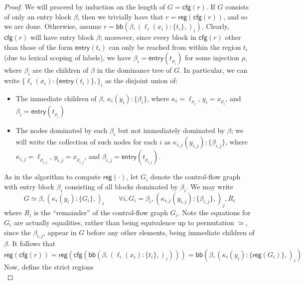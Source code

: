 \documentclass[acmsmall,screen,review]{acmart}
\newcommand{\ms}[1]{\ensuremath{\mathsf{#1}}}
\newcommand{\lto}{:}
\newcommand{\wbranch}[3]{#1(#2) \lto \{#3\}}
\newcommand{\toentry}[1]{\ms{entry}(#1)}
\newcommand{\tocfg}[1]{\ms{cfg}(#1)}
\newcommand{\adddom}[2]{\ms{bb}(#1, #2)}
\newcommand{\toreg}[1]{\ms{reg}(#1)}
\begin{document}
\begin{proof}
  We will proceed by induction on the length of $G = \tocfg{r}$. If $G$ consists of only an entry
  block $\beta$, then we trivially have that $r = \toreg{\tocfg{r}}$, and so we are done. Otherwise,
  assume $r = \adddom{\beta}{(\wbranch{\ell_i}{x_i}{t_i},)_i}$. Clearly, $\tocfg{r}$ will have entry
  block $\beta$; moreover, since every block in $\tocfg{r}$ other than those of the form
  $\toentry{t_i}$ can only be reached from within the region $t_i$ (due to lexical scoping of
  labels), we have $\beta_i = \toentry{t_{\rho_i}}$ for some injection $\rho$, where $\beta_i$ are
  the children of $\beta$ in the dominance tree of $G$. In particular, we can write
  $\{\wbranch{\ell_i}{x_i}{\toentry{t_i}},\}_i$ as the disjoint union of:
  \begin{itemize}
    \item The immediate children of $\beta$, $\wbranch{\kappa_i}{y_i}{\beta_i}$, where 
      $\kappa_i = \ell_{\rho_i}$, $y_i = x_{\rho_i}$, and $\beta_i = \toentry{t_{\rho_i}}$
    \item The nodes dominated by each $\beta_i$ but not immediately dominated by $\beta$; we will
    write the collection of such nodes for each $i$ as $\wbranch{\kappa_{i, j}}{y_{i, j}}{\beta_{i,
    j}}$, where $\kappa_{i, j} = \ell_{\rho_{i, j}}$, $y_{i, j} = x_{\rho_{i, j}}$, and $\beta_{i,
    j} = \toentry{t_{\rho_{i, j}}}$.
  \end{itemize}
  As in the algorithm to compute $\toreg{\cdot}$, let $G_i$ denote the control-flow graph with 
  entry block $\beta_i$ consisting of all blocks dominated by $\beta_i$. We may write
  \begin{equation}
    G \simeq \beta, (\wbranch{\kappa_i}{y_i}{G_i},)_i \qquad
    \forall i, G_i = \beta_i, (\wbranch{\kappa_{i, j}}{y_{i, j}}{\beta_{i, j}},)_j, R_i
  \end{equation} 
  where $R_i$ is the ``remainder'' of the control-flow graph $G_i$. Note the equations for $G_i$ are
  actually equalities, rather than being equivalence up to permutation $\simeq$, since the
  $\beta_{i, j}$, appear in $G$ before any other elements, being immediate children of $\beta$. It
  follows that
  \begin{equation}
    \toreg{\tocfg{r}}
    = \toreg{\tocfg{\adddom{\beta}{(\wbranch{\ell_i}{x_i}{t_i},)_i}}}
    = \adddom{\beta}{(\wbranch{\kappa_i}{y_i}{\toreg{G_i}},)_i}
  \end{equation}
  Now, define the strict regions
  \begin{equation}

\end{equation}
\end{proof}
\end{document}
